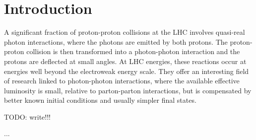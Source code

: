 \section{Introduction}

A significant fraction of proton-proton collisions at the LHC involves quasi-real photon interactions,
where the photons are emitted by both protons. The proton-proton collision is then transformed into a photon-photon interaction
and the protons are deflected at small angles. At LHC energies, these reactions
 occur at
energies well beyond the electroweak energy scale. They offer an interesting field of research linked to photon-photon interactions,
 where the available effective luminosity is small, relative to parton-parton interactions, but is compensated
by better known initial conditions and usually simpler final states. 

TODO: write!!!

...~\cite{Chatrchyan:2011ci}
